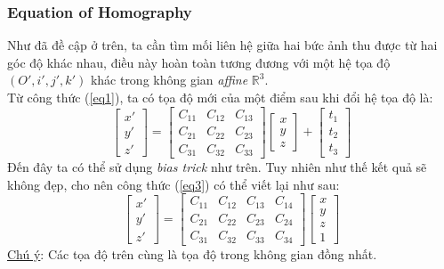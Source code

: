 \documentclass{article}
\begin{document}
\subsubsection{Equation of Homography}
Như đã đề cập ở trên, ta cần tìm mối liên hệ giữa hai bức ảnh thu được từ hai góc độ khác nhau, điều này hoàn toàn tương đương với một hệ tọa độ $(O',i',j',k')$ khác trong không gian \textit{affine} $\mathbb{R}^{3}$.\\
Từ công thức (\ref{eq1}), ta có tọa độ mới của một điểm sau khi đổi hệ tọa độ là:
\begin{equation}
\begin{bmatrix}
    x'\\y'\\z'
\end{bmatrix} = \begin{bmatrix}
    C_{11}&C_{12}&C_{13}\\
    C_{21}&C_{22}&C_{23}\\
    C_{31}&C_{32}&C_{33}
\end{bmatrix}\begin{bmatrix}
    x\\y\\z
\end{bmatrix}+\begin{bmatrix}
    t_1\\t_2\\t_3
\end{bmatrix}
\label{eq3}
\end{equation}
Đến đây ta có thể sử dụng \textit{bias trick} như trên. Tuy nhiên như thế kết quả sẽ không đẹp, cho nên công thức (\ref{eq3}) có thể viết lại như sau:
\begin{equation}
\begin{bmatrix}
    x'\\y'\\z'
\end{bmatrix} = \begin{bmatrix}
    C_{11}&C_{12}&C_{13}&C_{14}\\
    C_{21}&C_{22}&C_{23}&C_{24}\\
    C_{31}&C_{32}&C_{33}&C_{34}
\end{bmatrix}\begin{bmatrix}
    x\\y\\z\\1
\end{bmatrix}
\label{eq4}
\end{equation}
\underline{Chú ý}: Các tọa độ trên cùng là tọa độ trong không gian đồng nhất.\\
\end{document}
